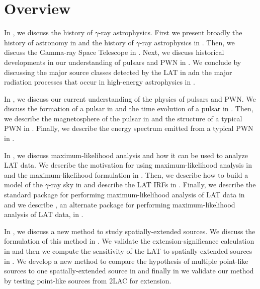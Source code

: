 \chapter{Overview}

In , we discuss the history of $\gamma$-ray
astrophysics. First we present broadly the history of astronomy in
 and the history of $\gamma$-ray
astrophysics in .  Then, we discuss
the \fermi Gamma-ray Space Telescope in .  Next,
we discuss historical developments in our understanding of pulsars and
\ac{PWN} in .  We conclude by discussing the major
source classes detected by the \ac{LAT} in 
adn the major radiation processes that occur in high-energy astrophysics
in .

In , we discuss our current understanding
of the physics of pulsars and \ac{PWN}.  We discuss the formation of a
pulsar in  and the time evolution of a
pulsar in .  Then, we describe the magnetosphere
of the pulsar in  and the structure of a
typical \ac{PWN} in .  Finally, we describe the
energy spectrum emitted from a typical \ac{PWN} in .

In , we discuss maximum-likelihood
analysis and how it can be used to analyze \ac{LAT} data.
We describe the motivation for using maximum-likelihood analysis
in 
and the maximum-likelihood formulation in
.  Then, we describe how to build
a model of the $\gamma$-ray sky in  and describe
the \ac{LAT} \acp{IRF} in .
Finally, 
we describe the standard
package \gtlike for performing maximum-likelihood analysis of \ac{LAT}
data in  and we describe \pointlike,
an alternate package for performing maximum-likelihood analysis of
\ac{LAT} data, in .

In , we discuss a new method to study
spatially-extended sources.  We discuss the formulation of this
method in .  We validate the
extension-significance calculation in  and then
we compute the sensitivity of the \ac{LAT} to spatially-extended
sources in .  We develop a new method
to compare the hypothesis of multiple point-like sources to one
spatially-extended source in  and
finally in  we validate our method by testing
point-like sources from \ac{2LAC} for extension.

